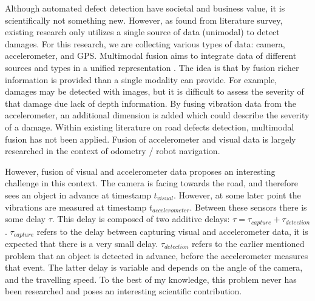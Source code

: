 Although automated defect detection have societal and business value, it is scientifically not something new. However, as found from literature survey, existing research only utilizes a single source of data (unimodal) to detect damages. For this research, we are collecting various types of data: camera, accelerometer, and GPS. Multimodal fusion aims to integrate data of different sources and types in a unified representation \cite{Baltrusaitis2017}. The idea is that by fusion richer information is provided than a single modality can provide. For example, damages may be detected with images, but it is difficult to assess the severity of that damage due lack of depth information. By fusing vibration data from the accelerometer, an additional dimension is added which could describe the severity of a damage. Within existing literature on road defects detection, multimodal fusion has not been applied. Fusion of accelerometer and visual data is largely researched in the context of odometry / robot navigation.

However, fusion of visual and accelerometer data proposes an interesting challenge in this context. The camera is facing towards the road, and therefore sees an object in advance at timestamp $t_{visual}$. However, at some later point the vibrations are measured at timestamp $t_{accelerometer}$. Between these sensors there is some delay $\tau$. This delay is composed of two additive delays: $\tau = \tau_{capture} + \tau_{detection}$. $\tau_{capture}$ refers to the delay between capturing visual and accelerometer data, it is expected that there is a very small delay. $\tau_{detection}$ refers to the earlier mentioned problem that an object is detected in advance, before the accelerometer measures that event. The latter delay is variable and depends on the angle of the camera, and the travelling speed. To the best of my knowledge, this problem never has been researched and poses an interesting scientific contribution.

